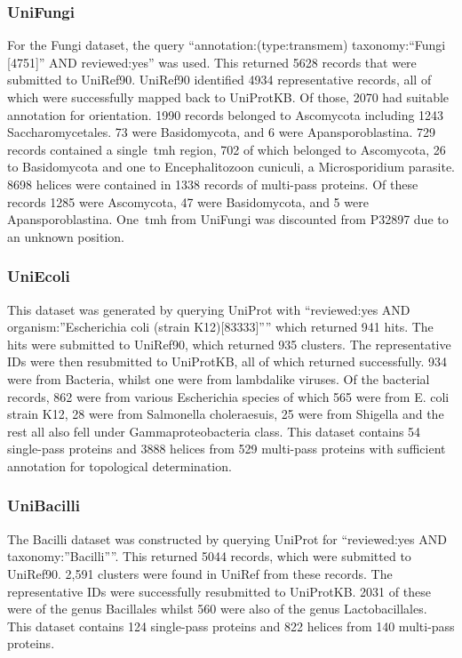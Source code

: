 \subsubsection{UniFungi}
For the Fungi dataset, the query ``annotation:(type:transmem) taxonomy:``Fungi [4751]'' AND reviewed:yes'' was used.
This returned 5628 records that were submitted to UniRef90.
UniRef90 identified 4934 representative records, all of which were successfully mapped back to UniProtKB.
Of those, 2070 had suitable annotation for orientation.
1990 records belonged to Ascomycota including 1243 Saccharomycetales.
73 were Basidomycota, and 6 were Apansporoblastina.
729 records contained a single~\gls{tmh} region, 702 of which belonged to Ascomycota, 26 to Basidomycota and one to Encephalitozoon cuniculi, a Microsporidium parasite.
8698 helices were contained in 1338 records of multi-pass proteins.
Of these records 1285 were Ascomycota, 47 were Basidomycota, and 5 were Apansporoblastina.
One~\gls{tmh} from UniFungi was discounted from P32897 due to an unknown position.

\subsubsection{UniEcoli}
This dataset was generated by querying UniProt with ``reviewed:yes AND organism:''Escherichia coli (strain K12)[83333]'''' which returned 941 hits.
The hits were submitted to UniRef90, which returned 935 clusters.
The representative IDs were then resubmitted to UniProtKB, all of which returned successfully.
934 were from Bacteria, whilst one were from lambdalike viruses.
Of the bacterial records, 862 were from various Escherichia species of which 565 were from E.
coli strain K12, 28 were from Salmonella choleraesuis, 25 were from Shigella and the rest all also fell under Gammaproteobacteria class.
This dataset contains 54 single-pass proteins and 3888 helices from 529 multi-pass proteins with sufficient annotation for topological determination.

\subsubsection{UniBacilli}
The Bacilli dataset was constructed by querying UniProt for ``reviewed:yes AND taxonomy:''Bacilli''''.
This returned 5044 records, which were submitted to UniRef90.
2,591 clusters were found in UniRef from these records.
The representative IDs were successfully resubmitted to UniProtKB.
2031 of these were of the genus Bacillales whilst 560 were also of the genus Lactobacillales.
This dataset contains 124 single-pass proteins and 822 helices from 140 multi-pass proteins.

